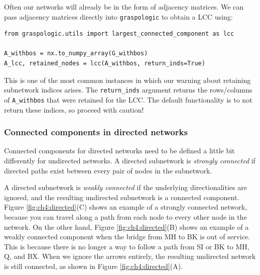 Often our networks will already be in the form of adjacency matrices. We can pass adjacency matrices directly into \texttt{graspologic} to obtain a LCC using:
\begin{lstlisting}
from graspologic.utils import largest_connected_component as lcc

A_withbos = nx.to_numpy_array(G_withbos)
A_lcc, retained_nodes = lcc(A_withbos, return_inds=True)
\end{lstlisting}
This is one of the most common instances in which our warning about retaining subnetwork indices arises. The \texttt{return\_inds} argument returns the rows/columns of \texttt{A\_withbos} that were retained for the LCC. The default functionality is to {not} return these indices, so proceed with caution!

\subsubsection{Connected components in directed networks}

Connected components for directed networks need to be defined a little bit differently for undirected networks. A directed subnetwork is \textit{strongly connected} if directed paths exist between every pair of nodes in the subnetwork. 

A directed subnetwork is \textit{weakly connected} if the underlying directionalities are ignored, and the resulting undirected subnetwork is a connected component. Figure \ref{fig:ch4:directed}(C) shows an example of a strongly connected network, because you can travel along a path from each node to every other node in the network. On the other hand, Figure \ref{fig:ch4:directed}(B) shows an example of a weakly connected component when the bridge from MH to BK is out of service. This is because there is no longer a way to follow a path from SI or BK to MH, Q, and BX. When we ignore the arrows entirely, the resulting undirected network is still connected, as shown in Figure \ref{fig:ch4:directed}(A).


\newpage